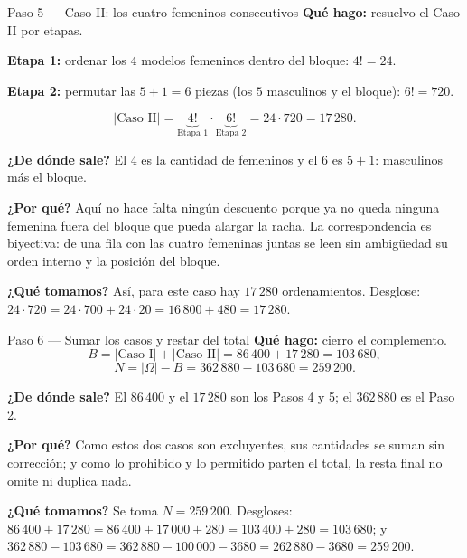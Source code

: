 \documentclass[11pt]{article}
\begin{document}
\begin{paso}{Paso 5 --- Caso II: los cuatro femeninos consecutivos}
\textbf{Qué hago:} resuelvo el Caso II por etapas.

\medskip
\textbf{Etapa 1:} ordenar los $4$ modelos femeninos dentro del bloque: $4!=24$.

\textbf{Etapa 2:} permutar las $5+1=6$ piezas (los $5$ masculinos y el bloque): $6!=720$.

\medskip
\[
  |\text{Caso II}| = \underbrace{4!}_{\text{Etapa 1}}\cdot \underbrace{6!}_{\text{Etapa 2}} = 24\cdot 720 = 17\,280 .
\]

\textbf{¿De dónde sale?} El $4$ es la cantidad de femeninos y el $6$ es $5+1$: masculinos más el bloque.

\textbf{¿Por qué?} Aquí no hace falta ningún descuento porque ya no queda ninguna femenina fuera del bloque que pueda alargar la racha. La correspondencia es biyectiva: de una fila con las cuatro femeninas juntas se leen sin ambigüedad su orden interno y la posición del bloque.

\textbf{¿Qué tomamos?} Así, para este caso hay $17\,280$ ordenamientos. Desglose: $24\cdot 720 = 24\cdot 700 + 24\cdot 20 = 16\,800+480 = 17\,280$.
\end{paso}

\begin{paso}{Paso 6 --- Sumar los casos y restar del total}
\textbf{Qué hago:} cierro el complemento.
\[
  B = |\text{Caso I}|+|\text{Caso II}| = 86\,400+17\,280 = 103\,680 ,
\]
\[
  N = |\Omega| - B = 362\,880 - 103\,680 = 259\,200 .
\]

\textbf{¿De dónde sale?} El $86\,400$ y el $17\,280$ son los Pasos 4 y 5; el $362\,880$ es el Paso 2.

\textbf{¿Por qué?} Como estos dos casos son excluyentes, sus cantidades se suman sin corrección; y como lo prohibido y lo permitido parten el total, la resta final no omite ni duplica nada.

\textbf{¿Qué tomamos?} Se toma $N=259\,200$. Desgloses: $86\,400+17\,280 = 86\,400+17\,000+280 = 103\,400+280 = 103\,680$; y $362\,880-103\,680 = 362\,880-100\,000-3680 = 262\,880-3680 = 259\,200$.
\end{paso}
\end{document}
